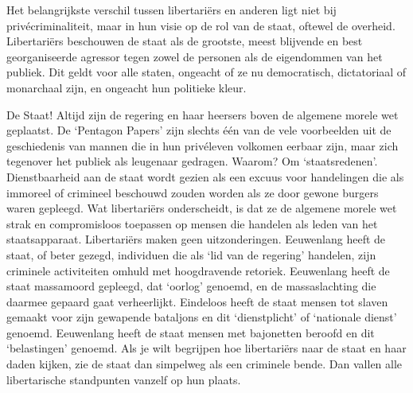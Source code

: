 \documentclass[
  a5paper,
  smalldemyvopaper,10pt,twoside,onecolumn,openright,extrafontsizes,hidelinks]{memoir}
\begin{document}
Het belangrijkste verschil tussen libertariërs en anderen ligt niet bij
privécriminaliteit, maar in hun visie op de rol van de staat, oftewel de
overheid. Libertariërs beschouwen de staat als de grootste, meest
blijvende en best georganiseerde agressor tegen zowel de personen als de
eigendommen van het publiek. Dit geldt voor alle staten, ongeacht of ze
nu democratisch, dictatoriaal of monarchaal zijn, en ongeacht hun
politieke kleur.

De Staat! Altijd zijn de regering en haar heersers boven de algemene
morele wet geplaatst. De `Pentagon Papers' zijn slechts één van de vele
voorbeelden uit de geschiedenis van mannen die in hun privéleven
volkomen eerbaar zijn, maar zich tegenover het publiek als leugenaar
gedragen. Waarom? Om `staatsredenen'. Dienstbaarheid aan de staat wordt
gezien als een excuus voor handelingen die als immoreel of crimineel
beschouwd zouden worden als ze door gewone burgers waren gepleegd. Wat
libertariërs onderscheidt, is dat ze de algemene morele wet strak en
compromisloos toepassen op mensen die handelen als leden van het
staatsapparaat. Libertariërs maken geen uitzonderingen. Eeuwenlang heeft
de staat, of beter gezegd, individuen die als `lid van de regering'
handelen, zijn criminele activiteiten omhuld met hoogdravende retoriek.
Eeuwenlang heeft de staat massamoord gepleegd, dat `oorlog' genoemd, en
de massaslachting die daarmee gepaard gaat verheerlijkt. Eindeloos heeft
de staat mensen tot slaven gemaakt voor zijn gewapende bataljons en dit
`dienstplicht' of `nationale dienst' genoemd. Eeuwenlang heeft de staat
mensen met bajonetten beroofd en dit `belastingen' genoemd. Als je wilt
begrijpen hoe libertariërs naar de staat en haar daden kijken, zie de
staat dan simpelweg als een criminele bende. Dan vallen alle
libertarische standpunten vanzelf op hun plaats.
\end{document}
